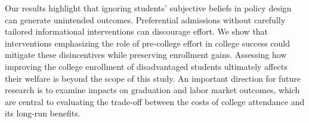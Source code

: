 Our results highlight that ignoring students’ subjective beliefs in policy design can generate unintended outcomes. Preferential admissions without carefully tailored informational interventions can discourage effort. We show that interventions emphasizing the role of pre-college effort in college success could mitigate these disincentives while preserving enrollment gains. 
Assessing how improving the college enrollment of disadvantaged students ultimately affects their welfare is beyond the scope of this study.  An important direction for future research is to examine impacts on graduation and labor market outcomes, which are central to evaluating the trade-off between the costs of college attendance and its long-run benefits.  \par 


